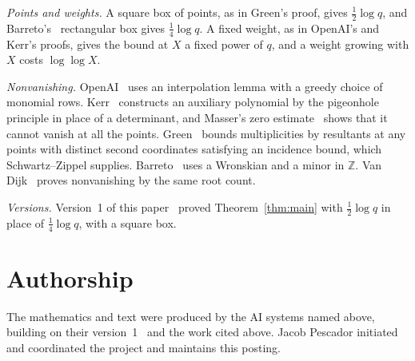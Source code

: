 \documentclass[11pt]{amsart}
\theoremstyle{remark}
\newcommand{\Z}{\mathbb{Z}}
\begin{document}
\emph{Points and weights.} A square box of points, as in Green's proof, gives $\frac12\log q$, and
Barreto's~\cite{Barreto} rectangular box gives $\frac14\log q$. A fixed weight, as in OpenAI's and Kerr's
proofs, gives the bound at $X$ a fixed power of $q$, and a weight growing with $X$ costs $\log\log X$.

\emph{Nonvanishing.} OpenAI~\cite{OpenAI} uses an interpolation lemma with a greedy choice of monomial rows.
Kerr~\cite{Kerr} constructs an auxiliary polynomial by the pigeonhole principle in place of a
determinant, and Masser's zero estimate~\cite{Masser} shows that it cannot vanish at all the points.
Green~\cite[Lemma~3.1]{Green} bounds multiplicities by resultants at any points with distinct
second coordinates satisfying an incidence bound, which Schwartz--Zippel supplies. Barreto~\cite{Barreto} uses a Wronskian and a minor in $\Z$. Van Dijk~\cite{vanDijk} proves nonvanishing by the same root count.

\emph{Versions.} Version~1 of this paper~\cite{v1} proved Theorem~\ref{thm:main} with $\frac12\log q$ in
place of $\frac14\log q$, with a square box.

\section*{Authorship}
The mathematics and text were produced by the AI systems named above, building on their version~1~\cite{v1}
and the work cited above. Jacob Pescador initiated and coordinated the project and
maintains this posting.
\end{document}
